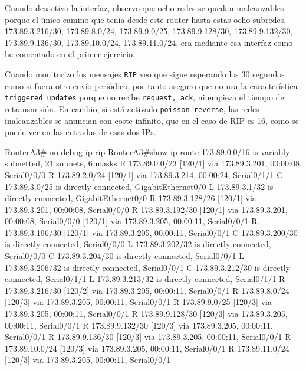 \par Cuando desactivo la interfaz, observo que ocho redes se quedan inalcanzables porque el único camino que tenía desde este router hasta estas ocho subredes, 173.89.3.216/30, 173.89.8.0/24, 173.89.9.0/25, 173.89.9.128/30, 173.89.9.132/30, 173.89.9.136/30, 173.89.10.0/24, 173.89.11.0/24, era mediante esa interfaz como he comentado en el primer ejercicio.
\par Cuando monitorizo los mensajes \texttt{RIP} veo que sigue esperando los 30 segundos como si fuera otro envío periódico, por tanto aseguro que no usa la característica \texttt{triggered updates} porque no recibe \texttt{request, ack}, ni empieza el tiempo de retransmisión. En cambio, si está activado \texttt{poisson reverse}, las redes inalcanzables se anuncian con coste infinito, que en el caso de RIP es 16, como se puede ver en las entradas de esas dos IPs.
\begin{listing}[style=consola]
RouterA3# no debug ip rip
RouterA3#show ip route
	173.89.0.0/16 is variably subnetted, 21 subnets, 6 masks
R       173.89.0.0/23 [120/1] via 173.89.3.201, 00:00:08, Serial0/0/0
R       173.89.2.0/24 [120/1] via 173.89.3.214, 00:00:24, Serial0/1/1
C       173.89.3.0/25 is directly connected, GigabitEthernet0/0
L       173.89.3.1/32 is directly connected, GigabitEthernet0/0
R       173.89.3.128/26 [120/1] via 173.89.3.201, 00:00:08, Serial0/0/0
R       173.89.3.192/30 [120/1] via 173.89.3.201, 00:00:08, Serial0/0/0
                        [120/1] via 173.89.3.205, 00:00:11, Serial0/0/1
R       173.89.3.196/30 [120/1] via 173.89.3.205, 00:00:11, Serial0/0/1
C       173.89.3.200/30 is directly connected, Serial0/0/0
L       173.89.3.202/32 is directly connected, Serial0/0/0
C       173.89.3.204/30 is directly connected, Serial0/0/1
L       173.89.3.206/32 is directly connected, Serial0/0/1
C       173.89.3.212/30 is directly connected, Serial0/1/1
L       173.89.3.213/32 is directly connected, Serial0/1/1
R       173.89.3.216/30 [120/2] via 173.89.3.205, 00:00:11, Serial0/0/1
R       173.89.8.0/24 [120/3] via 173.89.3.205, 00:00:11, Serial0/0/1
R       173.89.9.0/25 [120/3] via 173.89.3.205, 00:00:11, Serial0/0/1
R       173.89.9.128/30 [120/3] via 173.89.3.205, 00:00:11, Serial0/0/1
R       173.89.9.132/30 [120/3] via 173.89.3.205, 00:00:11, Serial0/0/1
R       173.89.9.136/30 [120/3] via 173.89.3.205, 00:00:11, Serial0/0/1
R       173.89.10.0/24 [120/3] via 173.89.3.205, 00:00:11, Serial0/0/1
R       173.89.11.0/24 [120/3] via 173.89.3.205, 00:00:11, Serial0/0/1
\end{listing}
